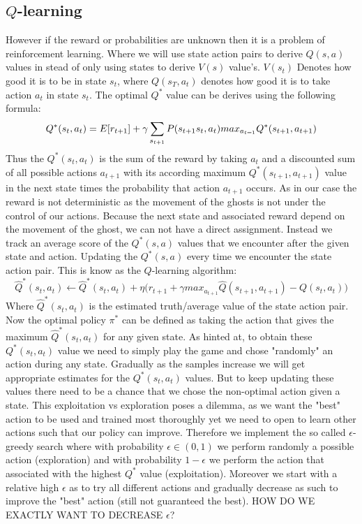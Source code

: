 \documentclass[a4paper]{article}
\begin{document}
\subsection{$Q$-learning}
However if the reward or probabilities are unknown then it is a problem of reinforcement learning. Where we will use state action pairs to derive $Q(s,a)$ values in stead of only using states to derive $V(s)$ value's. $V(s_t)$ Denotes how good it is to be in state $s_t$, where $Q(s_T,a_t)$ denotes how good it is to take action $a_t$ in state $s_t$. The optimal $Q^*$ value can be derives using the following formula:
\begin{equation*}
Q^*(s_t,a_t)=E[r_{t+1}]+\gamma\sum_{s_{t+1}}P(s_{t+1}\\s_t,a_t)max_{a_{t=1}}Q^*(s_{t+1},a_{t+1})
\end{equation*}
Thus the $Q^*(s_t,a_t)$ is the sum of the reward by taking $a_t$ and a discounted sum of all possible actions $a_{t+1}$ with its according maximum $Q^*(s_{t+1},a_{t+1})$ value in the next state times the probability that action $a_{t+1}$ occurs. As in our case the reward is not deterministic as the movement of the ghosts is not under the control of our actions. Because the next state and associated reward depend on the movement of the ghost, we can not have a direct assignment. Instead we track an average score of the $Q^*(s,a)$ values that we encounter after the given state and action. Updating the $Q^*(s,a)$ every time we encounter the state action pair. This is know as the $Q$-learning algorithm: 
\begin{equation*}
\hat Q^*(s_t,a_t)\leftarrow \hat Q^*(s_t,a_t) + \eta\Big(r_{t+1} +\gamma max_{a_{t+1}}\hat Q(s_{t+1},a_{t+1})-Q(s_t,a_t)\Big)
\end{equation*}
Where $\hat Q^*(s_t,a_t)$ is the estimated truth/average value of the state action pair. Now the optimal policy $\pi^*$ can be defined as taking the action that gives the maximum $\hat Q^*(s_t,a_t)$ for any given state. As hinted at, to obtain these $Q^*(s_t,a_t)$ value we need to simply play the game and chose "randomly" an action during any state. Gradually as the samples increase we will get appropriate estimates for the $Q^*(s_t,a_t)$ values. But to keep updating these values there need to be a chance that we chose the non-optimal action given a state. This exploitation vs exploration poses a dilemma, as we want the "best" action to be used and trained most thoroughly yet we need to open to learn other actions such that our policy can improve. Therefore we implement the so called $\epsilon$-greedy search where with probability $\epsilon\in(0,1)$ we perform randomly a possible action (exploration) and with probability $1-\epsilon$ we perform the action that associated with the highest $Q^*$ value (exploitation). Moreover we start with a relative high $\epsilon$ as to try all different actions and gradually decrease as such to improve the "best" action (still not guaranteed the best). HOW DO WE EXACTLY WANT TO DECREASE $\epsilon$?
\end{document}
